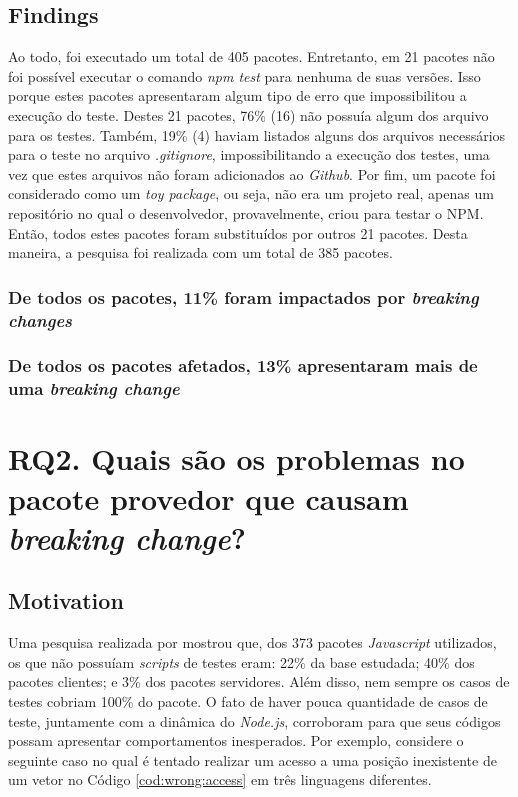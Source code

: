 \subsection{Findings}
\label{fin:rq1}
Ao todo, foi executado um total de 405 pacotes. Entretanto, em 21 pacotes não foi possível executar o comando \textit{npm test} para nenhuma de suas versões. Isso porque estes pacotes apresentaram algum tipo de erro que impossibilitou a execução do teste. Destes 21 pacotes, 76\% (16) não possuía algum dos arquivo para os testes. Também, 19\% (4) haviam listados alguns dos arquivos necessários para o teste no arquivo \textit{.gitignore}, impossibilitando a execução dos testes, uma vez que estes arquivos não foram adicionados ao \textit{Github}. Por fim, um pacote foi considerado como um \textit{toy package}, ou seja, não era um projeto real, apenas um repositório no qual o desenvolvedor, provavelmente, criou para testar o \gls{NPM}. Então, todos estes pacotes foram substituídos por outros 21 pacotes. Desta maneira, a pesquisa foi realizada com um total de 385 pacotes.

\subsubsection{De todos os pacotes, 11\% foram impactados por \textit{breaking changes}}


\subsubsection{De todos os pacotes afetados, 13\% apresentaram mais de uma \textit{breaking change}}

\section{RQ2. Quais são os problemas no pacote provedor que causam \textit{breaking change}?}
\label{sec:rq2}

\subsection{Motivation}
\label{mot:rq2}

Uma pesquisa realizada por  mostrou que, dos 373 pacotes \textit{Javascript} utilizados, os que não possuíam \textit{scripts} de testes eram: 22\% da base estudada; 40\% dos pacotes clientes; e 3\% dos pacotes servidores. Além disso, nem sempre os casos de testes cobriam 100\% do pacote. O fato de haver pouca quantidade de casos de teste, juntamente com a dinâmica do \textit{Node.js}, corroboram para que seus códigos possam apresentar comportamentos inesperados. Por exemplo, considere o seguinte caso no qual é tentado realizar um acesso a uma posição inexistente de um vetor no Código \ref{cod:wrong:access} em três linguagens diferentes.

